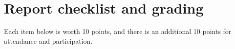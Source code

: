 %
%
%
%	
%	

\section{Report checklist and grading}

Each item below is worth 10 points, and there is an additional 10 points for attendance and participation.

